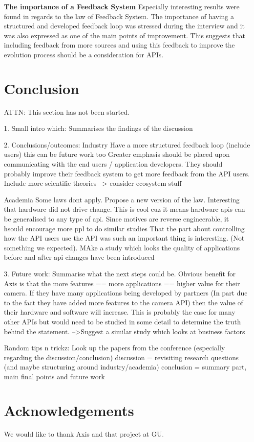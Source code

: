 \documentclass{sig-alternate}
\begin{document}
\smallskip \noindent
\textbf{The importance of a Feedback System  } %
Especially interesting results were found in regards to the law of Feedback System. The importance of having a structured and developed feedback loop was stressed during the interview and it was also expressed as one of the main points of improvement. This suggests that including feedback from more sources and using this feedback to improve the evolution process should be a consideration for APIs. 






\section{Conclusion} \label{conclusion}
ATTN: This section has not been started. 

1. Small intro which: Summarises the findings of the discussion

2. Conclusions/outcomes:
Industry
Have a more structured feedback loop (include users) this can be future work too
              Greater emphasis should be placed upon communicating with the end users / application developers. They should probably improve their feedback system to get more feedback from the API users.
              Include more scientific theories
              --> consider ecosystem stuff

Academia
Some laws dont apply. Propose a new version of the law.
Interesting that hardware did not drive change. This is cool cuz it means hardware apis can be generalised to any type of api.
Since motives are reverse engineerable, it hsould encourage more ppl to do similar studies
That the part about controlling how the API users use the API was such an important thing is interesting. (Not something we expected). 
       MAke a study which looks the quality of applications before and after api changes have been introduced

3. Future work: Summarise what the next steps could be.
Obvious benefit for Axis is that the more features == more applications == higher value for their camera. If they have many applications being developed by partners (In part due to the fact they have added more features to the camera API) then the value of their hardware and software will increase. This is probably the case for many other APIs but would need to be studied in some detail to determine the truth behind the statement.
       -->Suggest a similar study which looks at business factors


Random tips n trickz:
       Look up the papers from the conference (especially regarding the discussion/conclusion)
       discussion = revisiting research questions (and maybe structuring around industry/academia)
       conclusion = summary part, main final points and future work 





\section{Acknowledgements}
We would like to thank Axis and that project at GU. 


 
\end{document}
